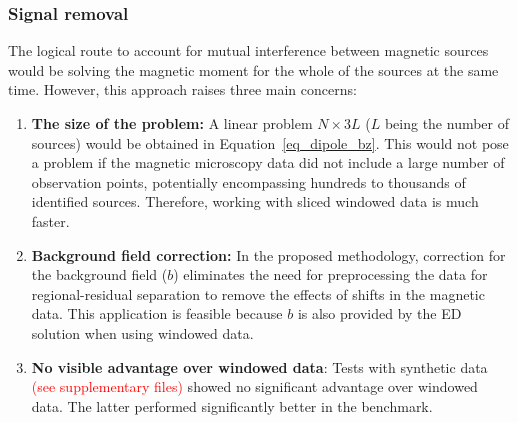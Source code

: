 
     

\subsubsection{Signal removal} 
    The logical route to account for mutual interference between magnetic sources would be solving the magnetic moment for the whole of the sources at the same time. However, this approach raises three main concerns:
    \begin{enumerate}
        \item \textbf{The size of the problem:} A linear problem $N \times 3L$ ($L$ being the number of sources) would be obtained in Equation~\ref{eq_dipole_bz}. This would not pose a problem if the magnetic microscopy data did not include a large number of observation points, potentially encompassing hundreds to thousands of identified sources. Therefore, working with sliced windowed data is much faster.
        
        \item \textbf{Background field correction:} In the proposed methodology, correction for the background field ($b$) eliminates the need for preprocessing the data for regional-residual separation to remove the effects of shifts in the magnetic data. This application is feasible because $b$ is also provided by the ED solution when using windowed data.
        
        \item \textbf{No visible advantage over windowed data}: Tests with synthetic data \textcolor{red}{(see supplementary files)} showed no significant advantage over windowed data. The latter performed significantly better in the benchmark.

    \end{enumerate}
    
